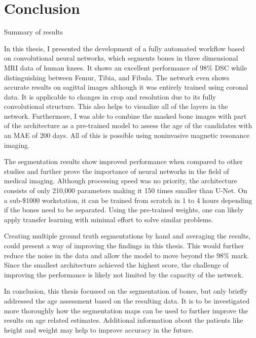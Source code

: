 \section{Conclusion}

Summary of results

In this thesis, I presented the development of a fully automated workflow based on convolutional neural networks, which segments bones in three dimensional MRI data of human knees. It shows an excellent performance of 98\% DSC while distinguishing between Femur, Tibia, and Fibula. The network even shows accurate results on sagittal images although it was entirely trained using coronal data. It is applicable to changes in crop and resolution due to its fully convolutional structure. This also helps to visualize all of the layers in the network. Furthermore, I was able to combine the masked bone images with part of the architecture as a pre-trained model to assess the age of the candidates with an MAE of 200 days. All of this is possible using noninvasive magnetic resonance imaging.

The segmentation results show improved performance when compared to other studies and further prove the importance of neural networks in the field of medical imaging. Although processing speed was no priority, the architecture consists of only 210,000 parameters making it 150 times smaller than U-Net. On a sub-\$1000 workstation, it can be trained from scratch in 1 to 4 hours depending if the bones need to be separated. Using the pre-trained weights, one can likely apply transfer learning with minimal effort to solve similar problems.

Creating multiple ground truth segmentations by hand and averaging the results, could present a way of improving the findings in this thesis. This would further reduce the noise in the data and allow the model to move beyond the 98\% mark. Since the smallest architecture achieved the highest score, the challenge of improving the performance is likely not limited by the capacity of the network.

In conclusion, this thesis focussed on the segmentation of bones, but only briefly addressed the age assessment based on the resulting data. It is to be investigated more thoroughly how the segmentation maps can be used to further improve the results on age related estimates. Additional information about the patients like height and weight may help to improve accuracy in the future.

\newpage